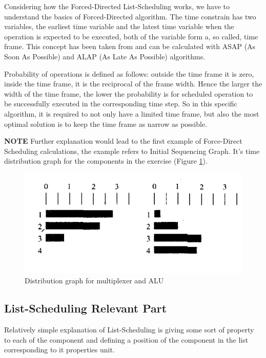 \documentclass[conference]{IEEEtran}
\begin{document}
Considering how the Forced-Directed List-Scheduling works, we have to understand the basics of Forced-Directed algorithm. The time constrain has two variables, the earliest time variable and the latest time variable when the operation is expected to be executed, both of the variable form a, so called, time frame. This concept has been taken from and can be calculated with ASAP (As Soon As Possible) and ALAP (As Late As Possible) algorithms.

Probability of operations is defined as follows: outside the time frame it is zero, inside the time frame, it is the reciprocal of the frame width. Hence the larger the width of the time frame, the lower the probability is for scheduled operation to be successfully executed in the corresponding time step. So in this specific algorithm, it is required to not only have a limited time frame, but also the most optimal solution is to keep the time frame as narrow as possible.

\textbf{NOTE} Further explanation would lead to the first example of Force-Direct Scheduling calculations, the example refers to Initial Sequencing Graph. It's time distribution graph for the components in the exercise (Figure \ref{fdexample}).

\begin{figure}[htbp]
\centerline{\includegraphics[scale=.5]{Example5.4.10.png}}
\caption{Distribution graph for multiplexer and ALU}
\label{fdexample}
\end{figure}

\subsection{List-Scheduling Relevant Part}
Relatively simple explanation of List-Scheduling is giving some sort of property to each of the component and defining a position of the component in the list corresponding to it properties unit.
\end{document}
